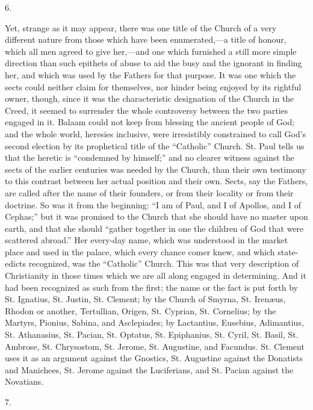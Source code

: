 6.

Yet, strange as it may appear, there was one title of
the Church of a very different nature from those which
have been enumerated,—a title of honour, which all
men agreed to give her,—and one which furnished a
still more simple direction than such epithets of abuse
to aid the busy and the ignorant in finding her, and
which was used by the Fathers for that purpose. It was
one which the sects could neither claim for themselves,
nor hinder being enjoyed by its rightful owner, though,
since it was the characteristic designation of the Church
in the Creed, it seemed to surrender the whole
controversy between the two parties engaged in it. Balaam
could not keep from blessing the ancient people of God;
and the whole world, heresies inclusive, were
irresistibly constrained to call God's second election by
its prophetical title of the ``Catholic'' Church.
St. Paul tells us that the heretic is ``condemned by
himself;'' and no clearer witness against the sects
of the earlier centuries was needed by the Church, than
their own testimony to this contrast between her actual
position and their own. Sects, say the Fathers, are
called after the name of their founders, or from their
locality or from their doctrine. So was it from the
beginning: ``I am of Paul, and I of Apollos, and I of
Cephas;'' but it was promised to the Church that she
should have no master upon earth, and that she should
``gather together in one the children of God that
were scattered abroad.'' Her every-day name, which
was understood in the market place and used in the
palace, which every chance comer knew, and which
state-edicts recognized, was the ``Catholic''
Church. This was that very description of Christianity in
those times which we are all along engaged in
determining. And it had been recognized as such from the
first; the name or the fact is put forth by St. Ignatius,
St. Justin, St. Clement; by the Church of Smyrna, St. Irenæus, Rhodon or another, Tertullian, Origen, St.
Cyprian, St. Cornelius; by the Martyrs, Pionius, Sabina,
and Asclepiades; by Lactantius, Eusebius, Adimantius, St. Athanasius, St. Pacian, St. Optatus, St. Epiphanius, St.
Cyril, St. Basil, St. Ambrose, St. Chrysostom, St.
Jerome, St. Augustine, and Facundus. St. Clement uses it
as an argument against the Gnostics, St. Augustine
against the Donatists and Manichees, St. Jerome against
the Luciferians, and St. Pacian against the Novatians.

7.

